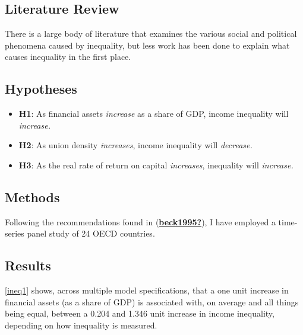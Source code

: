 \documentclass[
  12pt,
]{article}
\begin{document}
\hypertarget{literature-review}{%
\subsection{Literature Review}\label{literature-review}}

There is a large body of literature that examines the various social and
political phenomena caused by inequality, but less work has been done to
explain what causes inequality in the first place.

\hypertarget{hypotheses}{%
\subsection{Hypotheses}\label{hypotheses}}

\begin{itemize}
\item
  \textbf{H1}: As financial assets \emph{increase} as a share of GDP,
  income inequality will \emph{increase.}
\item
  \textbf{H2}: As union density \emph{increases}, income inequality will
  \emph{decrease.}
\item
  \textbf{H3}: As the real rate of return on capital \emph{increases},
  inequality will \emph{increase.}
\end{itemize}

\hypertarget{methods}{%
\subsection{Methods}\label{methods}}

Following the recommendations found in
(\protect\hyperlink{ref-beck1995}{\textbf{beck1995?}}), I have employed
a time-series panel study of 24 OECD countries.

\hypertarget{results}{%
\subsection{Results}\label{results}}

\autoref{ineq1} shows, across multiple model specifications, that a one
unit increase in financial assets (as a share of GDP) is associated
with, on average and all things being equal, between a 0.204 and 1.346
unit increase in income inequality, depending on how inequality is
measured.
\end{document}
